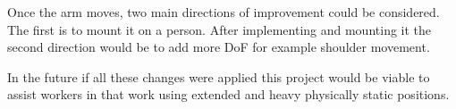 Once the arm moves, two main directions of improvement could be considered. The first is to mount it on a person. After 
implementing and mounting it the second direction would be to add more DoF for example shoulder movement.

In the future if all these changes were applied this project would be viable to assist workers in that work using extended and heavy 
physically static positions.